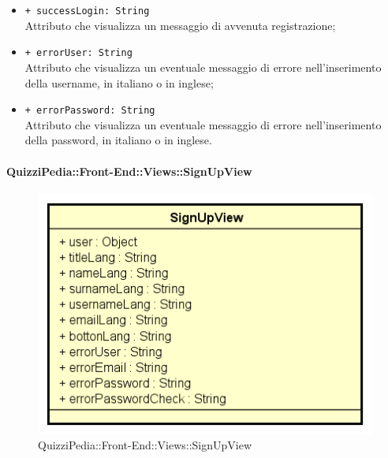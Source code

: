 \begin{itemize}
\begin{itemize}
		\item \texttt{+ successLogin: String} \\ Attributo che visualizza un messaggio di avvenuta registrazione;
		\item \texttt{+ errorUser: String} \\ Attributo che visualizza un eventuale messaggio di errore nell'inserimento della username, in italiano o in inglese;
		\item \texttt{+ errorPassword: String} \\ Attributo che visualizza un eventuale messaggio di errore nell'inserimento della password, in italiano o in inglese.
	\end{itemize}
\end{itemize}


\paragraph{QuizziPedia::Front-End::Views::SignUpView}
\begin{figure} [ht]
	\centering
	\includegraphics[scale=0.45]{UML/Classi/Front-End/QuizziPedia_Front-end_Views_SignUpView.png}
	\caption{QuizziPedia::Front-End::Views::SignUpView}
\end{figure} \FloatBarrier
